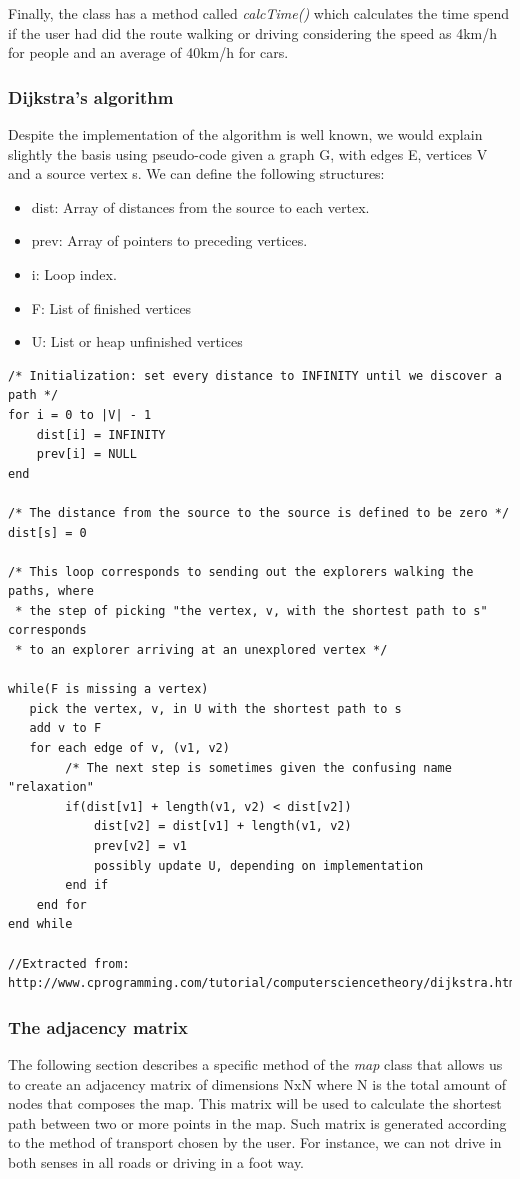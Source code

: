 \documentclass{article}
\begin{document}
Finally, the class has a method called \textit{calcTime()} which calculates the time spend if the user had did the route walking or driving considering the speed as 4km/h for people and an average of 40km/h for cars.

\subsubsection{Dijkstra's algorithm}
Despite the implementation of the algorithm is well known, we would explain slightly the basis using pseudo-code given a graph G, with edges E, vertices V and a source vertex s. We can define the following structures:

\begin{itemize}
  \item dist: Array of distances from the source to each vertex.
  \item prev: Array of pointers to preceding vertices.
  \item i: Loop index.
  \item F: List of finished vertices
  \item U: List or heap unfinished vertices
\end{itemize}


\begin{lstlisting}
/* Initialization: set every distance to INFINITY until we discover a path */
for i = 0 to |V| - 1
    dist[i] = INFINITY
    prev[i] = NULL
end

/* The distance from the source to the source is defined to be zero */
dist[s] = 0

/* This loop corresponds to sending out the explorers walking the paths, where
 * the step of picking "the vertex, v, with the shortest path to s" corresponds
 * to an explorer arriving at an unexplored vertex */

while(F is missing a vertex)
   pick the vertex, v, in U with the shortest path to s
   add v to F
   for each edge of v, (v1, v2)
        /* The next step is sometimes given the confusing name "relaxation"
        if(dist[v1] + length(v1, v2) < dist[v2])
            dist[v2] = dist[v1] + length(v1, v2)
            prev[v2] = v1
            possibly update U, depending on implementation
        end if
    end for
end while

//Extracted from: http://www.cprogramming.com/tutorial/computersciencetheory/dijkstra.html
\end{lstlisting}

\subsubsection{The adjacency matrix}
The following section describes a specific method of the \textit{map} class that allows us to create an adjacency matrix of dimensions NxN where N is the total amount of nodes that composes the map. This matrix will be used to calculate the shortest path between two or more points in the map. Such matrix is generated according to the method of transport chosen by the user. For instance, we can not drive in both senses in all roads or driving in a foot way.
\end{document}
